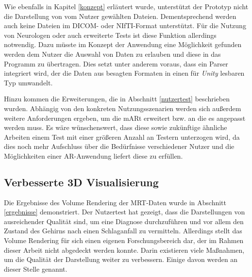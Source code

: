 Wie ebenfalls in Kapitel \ref{konzept} erläutert wurde, unterstützt der Prototyp nicht die Darstellung von vom Nutzer gewählten Dateien. Dementsprechend werden auch keine Dateien im DICOM- oder NIfTI-Format unterstützt. Für die Nutzung von Neurologen oder auch erweiterte Tests ist diese Funktion allerdings notwendig. Dazu müsste im Konzept der Anwendung eine Möglichkeit gefunden werden dem Nutzer die Auswahl von Daten zu erlauben und diese in das Programm zu übertragen. Dies setzt unter anderem voraus, dass ein Parser integriert wird, der die Daten aus besagten Formaten in einen für \textit{Unity} lesbaren Typ umwandelt. 

Hinzu kommen die Erweiterungen, die in Abschnitt \ref{nutzertest} beschrieben wurden. 
Abhängig von den konkreten Nutzungsszenarien werden sich außerdem weitere Anforderungen ergeben, um die mARt erweitert bzw. an die es angepasst werden muss. 
Es wäre wünschenswert, dass diese sowie zukünftige ähnliche Arbeiten einem Test mit einer größeren Anzahl an Testern unterzogen wird, da dies noch mehr Aufschluss über die Bedürfnisse verschiedener Nutzer und die Möglichkeiten einer AR-Anwendung liefert diese zu erfüllen.

\subsection{Verbesserte 3D Visualisierung}

Die Ergebnisse des Volume Rendering der MRT-Daten wurde in Abschnitt \ref{ergebnisse} demonstriert. Der Nutzertest hat gezeigt, dass die Darstellungen von ausreichender Qualität sind, um eine Diagnose durchzuführen und vor allem den Zustand des Gehirns nach einen Schlaganfall zu vermitteln. 
Allerdings stellt das Volume Rendering für sich einen eigenen Forschungsbereich dar, der im Rahmen dieser Arbeit nicht abgedeckt werden konnte. Darin existieren viele Maßnahmen, um die Qualität der Darstellung weiter zu verbessern. Einige davon werden an dieser Stelle genannt. 


